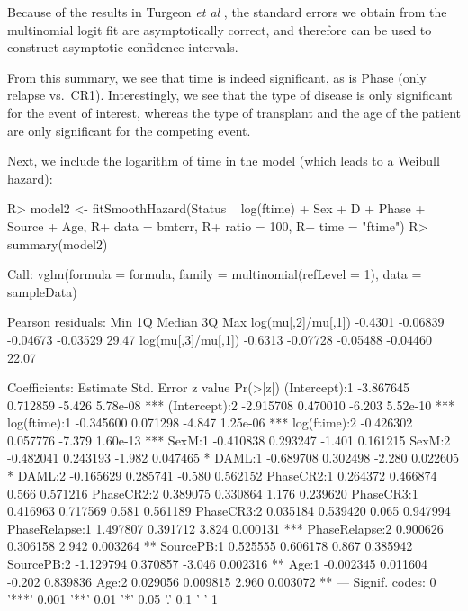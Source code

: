 \documentclass[article]{jss}
\begin{document}
Because of the results in Turgeon \emph{et al} \citep{turgeonCompRisk},
the standard errors we obtain from the multinomial logit fit are
asymptotically correct, and therefore can be used to construct
asymptotic confidence intervals.

From this summary, we see that time is indeed significant, as is Phase
(only relapse vs.~CR1). Interestingly, we see that the type of disease
is only significant for the event of interest, whereas the type of
transplant and the age of the patient are only significant for the
competing event.

Next, we include the logarithm of time in the model (which leads to a
Weibull hazard):

\begin{CodeChunk}

\begin{CodeInput}
R> model2 <- fitSmoothHazard(Status ~ log(ftime) + Sex + D + Phase + Source + Age, 
R+                           data = bmtcrr, 
R+                           ratio = 100, 
R+                           time = "ftime")
R> summary(model2)
\end{CodeInput}

\begin{CodeOutput}

Call:
vglm(formula = formula, family = multinomial(refLevel = 1), data = sampleData)


Pearson residuals:
                       Min       1Q   Median       3Q   Max
log(mu[,2]/mu[,1]) -0.4301 -0.06839 -0.04673 -0.03529 29.47
log(mu[,3]/mu[,1]) -0.6313 -0.07728 -0.05488 -0.04460 22.07

Coefficients: 
                Estimate Std. Error z value Pr(>|z|)    
(Intercept):1  -3.867645   0.712859  -5.426 5.78e-08 ***
(Intercept):2  -2.915708   0.470010  -6.203 5.52e-10 ***
log(ftime):1   -0.345600   0.071298  -4.847 1.25e-06 ***
log(ftime):2   -0.426302   0.057776  -7.379 1.60e-13 ***
SexM:1         -0.410838   0.293247  -1.401 0.161215    
SexM:2         -0.482041   0.243193  -1.982 0.047465 *  
DAML:1         -0.689708   0.302498  -2.280 0.022605 *  
DAML:2         -0.165629   0.285741  -0.580 0.562152    
PhaseCR2:1      0.264372   0.466874   0.566 0.571216    
PhaseCR2:2      0.389075   0.330864   1.176 0.239620    
PhaseCR3:1      0.416963   0.717569   0.581 0.561189    
PhaseCR3:2      0.035184   0.539420   0.065 0.947994    
PhaseRelapse:1  1.497807   0.391712   3.824 0.000131 ***
PhaseRelapse:2  0.900626   0.306158   2.942 0.003264 ** 
SourcePB:1      0.525555   0.606178   0.867 0.385942    
SourcePB:2     -1.129794   0.370857  -3.046 0.002316 ** 
Age:1          -0.002345   0.011604  -0.202 0.839836    
Age:2           0.029056   0.009815   2.960 0.003072 ** 
---
Signif. codes:  0 '***' 0.001 '**' 0.01 '*' 0.05 '.' 0.1 ' ' 1


\end{CodeOutput}
\end{CodeChunk}
\end{document}
